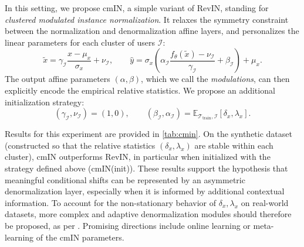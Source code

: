 In this setting, we propose cmIN, a simple variant of RevIN, standing for \textit{clustered modulated instance normalization}. It relaxes the symmetry constraint between the normalization and denormalization affine layers, and personalizes the linear parameters for each cluster of users $\mathcal{I}$:
\begin{equation}
    \tilde{x}
    =
    \gamma_\mathcal{I}\frac{x-\mu_x}{\sigma_x}+\nu_\mathcal{I},
    \qquad
    \hat{y}
    =
    \sigma_x
    \left(
        \alpha_\mathcal{I}
        \frac{f_\theta(\tilde{x})-\nu_\mathcal{I}}{\gamma_\mathcal{I}}
        +\beta_\mathcal{I}
    \right)
    +\mu_x.
    \label{eq:cmin}
\end{equation}
The output affine parameters $(\alpha,\beta)$, which we call the \emph{modulations}, can then explicitly encode the empirical relative statistics. We propose an additional initialization strategy:
\begin{equation}
    (\gamma_{\mathcal{I}},\nu_{\mathcal{I}})=(1,0),
    \qquad
    (\beta_{\mathcal{I}},\alpha_{\mathcal{I}})
    = \mathbb{E}_{\mathcal{T}_{\mathrm{train}},\mathcal{I}}
    [\delta_x,\lambda_x].
    \label{eq:cmin_init}
\end{equation}

\begin{table}[t]
\caption{Results of cmIN on PatchTST for the synthetic dataset, measured in
MSE on the Test1 split (new dates). In bold: best model per setting. Underline: second-best.}
\vspace{0.2cm}
\centering
{}
\label{tab:cmin}
\end{table}

\newpage
Results for this experiment are provided in \cref{tab:cmin}. On the synthetic dataset (constructed so that the relative statistics $(\delta_x,\lambda_x)$ are stable within each cluster), cmIN outperforms RevIN, in particular when initialized with the strategy defined above (cmIN(init)). These results support the hypothesis that
meaningful conditional shifts can be represented by an asymmetric
denormalization layer, especially when it is informed by additional contextual information. To account for the non-stationary behavior of $\delta_x,\lambda_x$ on real-world datasets, more complex and adaptive denormalization modules should therefore be proposed, as per \citep{dishts}. Promising directions include online learning or meta-learning of the cmIN parameters.

